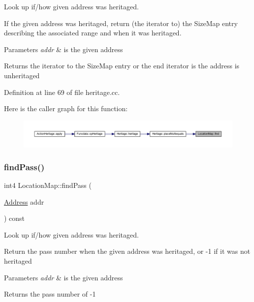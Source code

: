 Look up if/how given address was heritaged. 

If the given address was heritaged, return (the iterator to) the Size\+Map entry describing the associated range and when it was heritaged. 
\begin{DoxyParams}{Parameters}
{\em addr} & is the given address \\
\hline
\end{DoxyParams}
\begin{DoxyReturn}{Returns}
the iterator to the Size\+Map entry or the end iterator is the address is unheritaged 
\end{DoxyReturn}


Definition at line 69 of file heritage.\+cc.

Here is the caller graph for this function\+:
\nopagebreak
\begin{figure}[H]
\begin{center}
\leavevmode
\includegraphics[width=350pt]{class_location_map_a46317268798a00ecc792e87a4a360bef_icgraph}
\end{center}
\end{figure}
\mbox{\label{class_location_map_aa4e4c0f548533f8607a706cf7796c789}} 
\subsubsection{\texorpdfstring{findPass()}{findPass()}}
{\footnotesize\ttfamily int4 Location\+Map\+::find\+Pass (\begin{DoxyParamCaption}\item[{\mbox{\hyperlink{class_address}{Address}}}]{addr }\end{DoxyParamCaption}) const}



Look up if/how given address was heritaged. 

Return the pass number when the given address was heritaged, or -\/1 if it was not heritaged 
\begin{DoxyParams}{Parameters}
{\em addr} & is the given address \\
\hline
\end{DoxyParams}
\begin{DoxyReturn}{Returns}
the pass number of -\/1 
\end{DoxyReturn}


